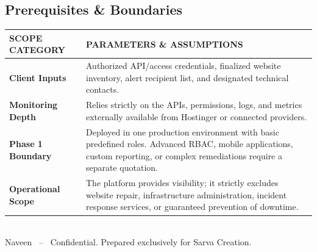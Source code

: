 \documentclass[11pt,a4paper]{article}
\newcommand{\thd}[1]{\textsc{\bfseries\color{white}\fontsize{8.6}{8.6}\selectfont #1}}
\begin{document}
\subsection{Prerequisites \& Boundaries}
\vspace{0.5em}
\renewcommand{\arraystretch}{1.7}
\noindent
\begin{longtable}{@{}>{\raggedright\arraybackslash}p{0.25\linewidth}p{0.75\linewidth}@{}}
\rowcolor{navy}
\thd{SCOPE CATEGORY} & \thd{PARAMETERS \& ASSUMPTIONS} \\
\midrule
\endhead %
\textbf{Client Inputs} & Authorized API/access credentials, finalized website inventory, alert recipient list, and designated technical contacts. \\
\rowcolor{tabletint}
\textbf{Monitoring Depth} & Relies strictly on the APIs, permissions, logs, and metrics externally available from Hostinger or connected providers. \\
\textbf{Phase 1 Boundary} & Deployed in one production environment with basic predefined roles. Advanced RBAC, mobile applications, custom reporting, or complex remediations require a separate quotation. \\
\rowcolor{tabletint}
\textbf{Operational Scope} & The platform provides visibility; it strictly excludes website repair, infrastructure administration, incident response services, or guaranteed prevention of downtime. \\
\bottomrule
\end{longtable}

\vfill
\noindent{\color{linegray}\rule{\linewidth}{0.6pt}}\\[6pt]
\fontsize{8.3}{10}\selectfont\textcolor{softgray}{Naveen \ -- \ Confidential. Prepared exclusively for Sarva Creation.}
\end{document}

